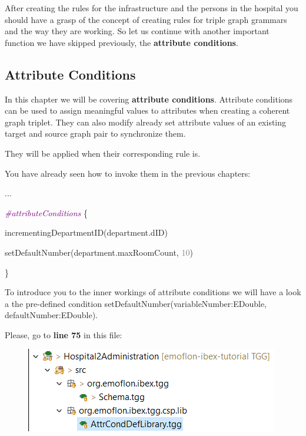 After creating the rules for the infrastructure and the persons in the hospital you should have a grasp of the concept of creating rules for triple graph grammars and the way they are working. So let us continue with another important function we have skipped previously, the \textbf{attribute conditions}. 

\clearpage

\subsection{Attribute Conditions}

In this chapter we will be covering \textbf{attribute conditions}. Attribute conditions can be used to assign meaningful values to attributes when creating a coherent graph triplet. They can also modify already set attribute values of an existing target and source graph pair to synchronize them.

They will be applied when their corresponding rule is.\newline

You have already seen how to invoke them in the previous chapters:

{

\hspace{0.5cm}...

\hspace{0.5cm}\textcolor{Purple}{\textit{\#attributeConditions}} \{

\hspace{1cm}incrementingDepartmentID(department.dID)

\hspace{1cm}setDefaultNumber(department.maxRoomCount, \textcolor{Grey}{10})

\hspace{0.5cm}\} \newline

}

To introduce you to the inner workings of attribute conditions we will have a look a the pre-defined condition \textsf{setDefaultNumber(variableNumber:EDouble, defaultNumber:EDouble)}.\newline

Please, go to \textbf{line 75} in this file:

\begin{figure}[h]
    \centering
    \includegraphics[scale=0.65 ]{pictures/locSetDefaultNumber.png}
    \caption{}
    \label{setDefaultNumber}
\end{figure}

